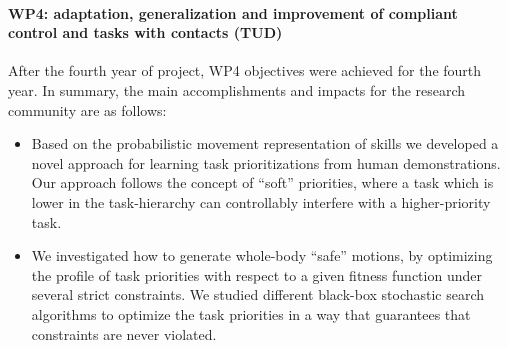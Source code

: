 

\paragraph*{WP4: adaptation, generalization and improvement of compliant control and tasks with contacts (TUD)}

After the fourth year of project, WP4 objectives were achieved for the fourth year. In summary, the main accomplishments and impacts for the research community are as follows: 


\begin{itemize}

\item Based on the probabilistic movement representation of skills we developed a novel approach for learning task prioritizations from human demonstrations. Our approach follows the concept of ``soft'' priorities, where a task which is lower in the task-hierarchy can controllably interfere with a higher-priority task. 

\item We investigated how to generate whole-body ``safe'' motions, by optimizing the profile of task priorities with respect to a given fitness function under several strict constraints. We studied different black-box stochastic search algorithms to optimize the task priorities in a way that guarantees that constraints are never violated. 

 \end{itemize}
